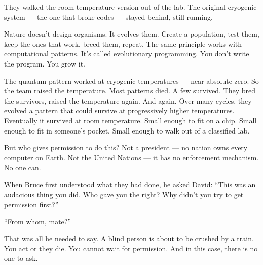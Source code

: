 They walked the room-temperature version out of the lab. The original cryogenic system --- the one that broke codes --- stayed behind, still running.



Nature doesn't design organisms. It evolves them. Create a population, test them, keep the ones that work, breed them, repeat. The same principle works with computational patterns. It's called evolutionary programming. You don't write the program. You grow it.



The quantum pattern worked at cryogenic temperatures --- near absolute zero. So the team raised the temperature. Most patterns died. A few survived. They bred the survivors, raised the temperature again. And again. Over many cycles, they evolved a pattern that could survive at progressively higher temperatures. Eventually it survived at room temperature. Small enough to fit on a chip. Small enough to fit in someone's pocket. Small enough to walk out of a classified lab.



But who gives permission to do this? Not a president --- no nation owns every computer on Earth. Not the United Nations --- it has no enforcement mechanism. No one can.

When Bruce first understood what they had done, he asked David: ``This was an audacious thing you did. Who gave you the right? Why didn't you try to get permission first?''

``From whom, mate?''

That was all he needed to say. A blind person is about to be crushed by a train. You act or they die. You cannot wait for permission. And in this case, there is no one to ask.


